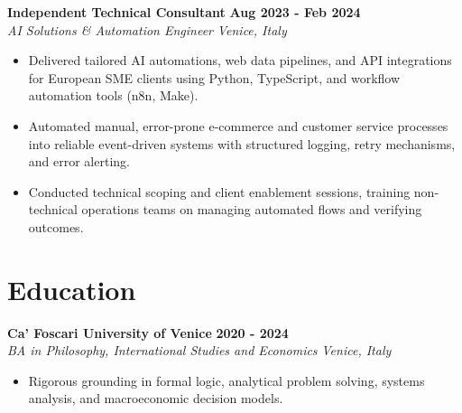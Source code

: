 \documentclass[10pt,a4paper]{article}
\newcommand{\role}[4]{%
  \textbf{#1} \hfill \textbf{#2}\\[1pt]%
  \textit{#3} \hfill \textit{#4}\\[2pt]%
}
\begin{document}
\role{Independent Technical Consultant}{Aug 2023 - Feb 2024}{AI Solutions \& Automation Engineer}{Venice, Italy}
\begin{itemize}
  \item Delivered tailored AI automations, web data pipelines, and API integrations for European SME clients using Python, TypeScript, and workflow automation tools (n8n, Make).
  \item Automated manual, error-prone e-commerce and customer service processes into reliable event-driven systems with structured logging, retry mechanisms, and error alerting.
  \item Conducted technical scoping and client enablement sessions, training non-technical operations teams on managing automated flows and verifying outcomes.
\end{itemize}

\section{Education}
\role{Ca' Foscari University of Venice}{2020 - 2024}{BA in Philosophy, International Studies and Economics}{Venice, Italy}
\begin{itemize}
  \item Rigorous grounding in formal logic, analytical problem solving, systems analysis, and macroeconomic decision models.
\end{itemize}
\end{document}
